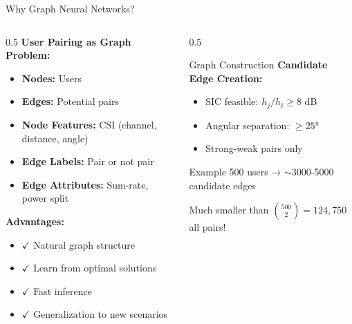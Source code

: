 \documentclass[aspectratio=169]{beamer}
\begin{document}
\begin{frame}{Why Graph Neural Networks?}
    \begin{columns}
        \begin{column}{0.5\textwidth}
            \textbf{User Pairing as Graph Problem:}
            \begin{itemize}
                \item \textbf{Nodes:} Users
                \item \textbf{Edges:} Potential pairs
                \item \textbf{Node Features:} CSI (channel, distance, angle)
                \item \textbf{Edge Labels:} Pair or not pair
                \item \textbf{Edge Attributes:} Sum-rate, power split
            \end{itemize}
            
            \vspace{0.3cm}
            
            \textbf{Advantages:}
            \begin{itemize}
                \item $\checkmark$ Natural graph structure
                \item $\checkmark$ Learn from optimal solutions
                \item $\checkmark$ Fast inference
                \item $\checkmark$ Generalization to new scenarios
            \end{itemize}
        \end{column}
        \begin{column}{0.5\textwidth}
            \begin{block}{Graph Construction}
                \textbf{Candidate Edge Creation:}
                \begin{itemize}
                    \item SIC feasible: $h_j/h_i \geq 8$ dB
                    \item Angular separation: $\geq 25°$
                    \item Strong-weak pairs only
                \end{itemize}
            \end{block}
            
            \vspace{0.2cm}
            
            \begin{exampleblock}{Example}
                500 users → $\sim$3000-5000 candidate edges
                
                \vspace{0.1cm}
                
                Much smaller than $\binom{500}{2} = 124,750$ all pairs!
            \end{exampleblock}
        \end{column}
    \end{columns}
\end{frame}
\end{document}

